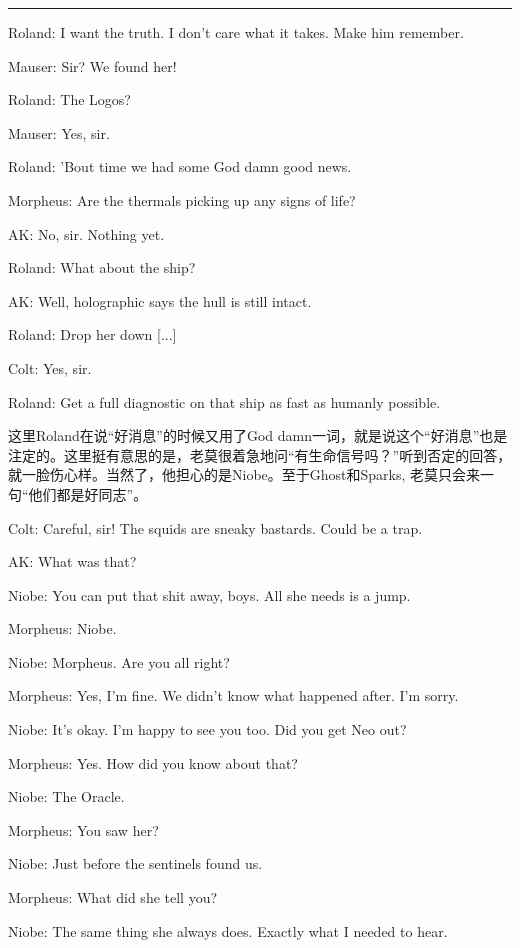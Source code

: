 \documentclass[UTF8]{ctexart}
\newcommand{\myparsep}{\noindent \rule[0.5ex]{\linewidth}{1pt}}
\newenvironment{myquote}{\color{green} \setlength{\leftskip}{6em} \setlength{\rightskip}{4em} \setlength{\parindent}{-2em}}{\par}
\begin{document}
\myparsep

\begin{myquote}
Roland: I want the truth. I don't care what it takes. Make him remember.

Mauser: Sir? We found her!

Roland: The Logos?

Mauser: Yes, sir.

Roland: 'Bout time we had some God damn good news.

Morpheus: Are the thermals picking up any signs of life?

AK: No, sir. Nothing yet.

Roland: What about the ship?

AK: Well, holographic says the hull is still intact.

Roland: Drop her down [...]

Colt: Yes, sir.

Roland: Get a full diagnostic on that ship as fast as humanly possible.
\end{myquote}

这里Roland在说“好消息”的时候又用了God damn一词，就是说这个“好消息”也是注定的。这里挺有意思的是，老莫很着急地问“有生命信号吗？”听到否定的回答，就一脸伤心样。当然了，他担心的是Niobe。至于Ghost和Sparks, 老莫只会来一句“他们都是好同志”。

\begin{myquote}
Colt: Careful, sir! The squids are sneaky bastards. Could be a trap.

AK: What was that?

Niobe: You can put that shit away, boys. All she needs is a jump.

Morpheus: Niobe.

Niobe: Morpheus. Are you all right?

Morpheus: Yes, I'm fine. We didn't know what happened after. I'm sorry.

Niobe: It's okay. I'm happy to see you too. Did you get Neo out?

Morpheus: Yes. How did you know about that?

Niobe: The Oracle.

Morpheus: You saw her?

Niobe: Just before the sentinels found us.

Morpheus: What did she tell you?

Niobe: The same thing she always does. Exactly what I needed to hear.
\end{myquote}
\end{document}
